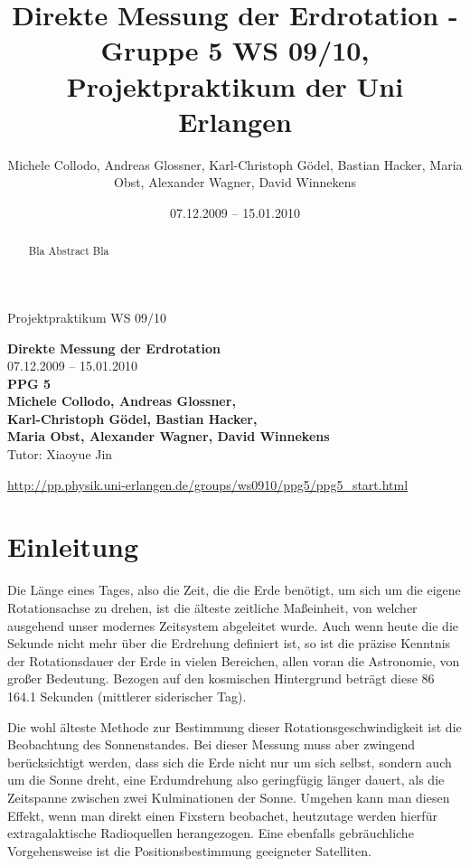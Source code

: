 \documentclass[11pt]{scrartcl}
\title{Direkte Messung der Erdrotation - Gruppe 5 WS 09/10, Projektpraktikum der Uni Erlangen}
\date{07.12.2009 -- 15.01.2010}
\author{Michele Collodo, Andreas Glossner, Karl-Christoph G\"odel, Bastian Hacker, Maria Obst, Alexander Wagner, David Winnekens}
\begin{document}
\sloppy %
\thispagestyle{empty}
\large{Projektpraktikum WS 09/10}
\hfill
{}
\\[8\baselineskip]
\begin{center}
{\fontsize{36}{54}\textbf{Direkte Messung der Erdrotation}}
\\[2\baselineskip]
{\Large 07.12.2009 -- 15.01.2010}
\\[7\baselineskip]
{\huge\textbf{PPG 5}}
\\[0.5\baselineskip]
{\large\textbf{
Michele Collodo,
Andreas Glossner,\\
Karl-Christoph G\"odel,
Bastian Hacker,\\
Maria Obst,
Alexander Wagner,
David Winnekens}\\
Tutor: Xiaoyue Jin}
\vfill



\small{\url{http://pp.physik.uni-erlangen.de/groups/ws0910/ppg5/ppg5\_start.html}}
\end{center}
\newpage



\tableofcontents
\vfill



\begin{abstract}
Bla Abstract Bla
\end{abstract}
\newpage

\section{Einleitung} %
Die Länge eines Tages, also die Zeit, die die Erde benötigt, um sich um die eigene Rotationsachse zu drehen, ist die älteste zeitliche Maßeinheit, von welcher ausgehend unser modernes Zeitsystem abgeleitet wurde. Auch wenn heute die die Sekunde nicht mehr über die Erdrehung definiert ist, so ist die präzise Kenntnis der Rotationsdauer der Erde in vielen Bereichen, allen voran die Astronomie, von großer Bedeutung. Bezogen auf den kosmischen Hintergrund beträgt diese 86 164.1 Sekunden (mittlerer siderischer Tag).

Die wohl älteste Methode zur Bestimmung dieser Rotationsgeschwindigkeit ist die Beobachtung des Sonnenstandes.
Bei dieser Messung muss aber zwingend berücksichtigt werden, dass sich die Erde nicht nur um sich selbst, sondern auch um die Sonne dreht, eine Erdumdrehung also geringfügig länger dauert, als die Zeitspanne zwischen zwei Kulminationen der Sonne. Umgehen kann man diesen Effekt, wenn man direkt einen Fixstern beobachet, heutzutage werden hierfür extragalaktische Radioquellen herangezogen. Eine ebenfalls gebräuchliche Vorgehensweise ist die Positionsbestimmung geeigneter Satelliten.
\end{document}
